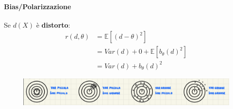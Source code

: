 \documentclass[]{article}
\newcommand{\ev}{\mathbb{E}[X]}
\renewcommand{\ev}[1]{\mathbb{E}\left[#1\right]}
\begin{document}
    \paragraph{Bias/Polarizzazione}
    Se $d(X)$ è \textbf{distorto}:
    \begin{equation*}
        \begin{split}
            r(d, \theta) &= \ev{(d - \theta)^2} \\
            &= Var(d) + 0 + \ev{b_\theta (d)^2} \\
            &= Var(d) + b_\theta(d)^2
        \end{split}
    \end{equation*}
    \begin{figure}[h]
        \includegraphics[width=\textwidth]{images/boh_4.png}    
    \end{figure}
\end{document}
